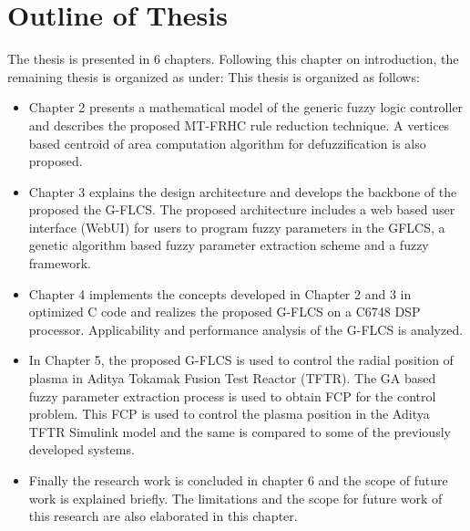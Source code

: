 \section{Outline of Thesis}
The thesis is presented in 6 chapters. Following this chapter on introduction, the remaining thesis is organized as under:
This thesis is organized as follows:
\begin{itemize}
	\item Chapter 2 presents a mathematical model of the generic fuzzy logic controller and describes the proposed MT\hyp{}FRHC rule reduction technique. A vertices based centroid of area computation algorithm for defuzzification is also proposed.
	\item Chapter 3 explains the design architecture and develops the backbone of the proposed the G\hyp{}FLCS. The proposed architecture includes a web based user interface (WebUI) for users to program fuzzy parameters in  the GFLCS, a genetic algorithm based fuzzy parameter extraction scheme and a fuzzy framework.
	\item Chapter 4 implements the concepts developed in Chapter 2 and 3 in optimized C code and realizes the proposed G\hyp{}FLCS on a C6748 DSP processor. Applicability and performance analysis of the G\hyp{}FLCS is analyzed.
	\item In Chapter 5, the proposed G\hyp{}FLCS is used to control the radial position of plasma in Aditya Tokamak Fusion Test Reactor (TFTR). The GA based fuzzy parameter extraction process is used to obtain FCP for the control problem. This FCP is used to control the plasma position in the Aditya TFTR Simulink model and the same is compared to some of the previously developed systems.
	\item Finally the research work is concluded in chapter 6 and the scope of future work is explained briefly. The limitations and the scope for future work of this research are also elaborated in this chapter.
\end{itemize}

